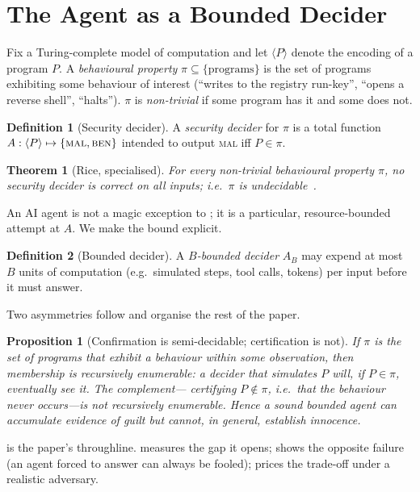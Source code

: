 \documentclass[11pt]{article}
\theoremstyle{plain}
\newtheorem{theorem}{Theorem}
\newtheorem{proposition}{Proposition}
\theoremstyle{definition}
\newtheorem{definition}{Definition}
\begin{document}
\section{The Agent as a Bounded Decider}
\label{sec:framework}
Fix a Turing-complete model of computation and let $\langle P\rangle$ denote
the encoding of a program $P$. A \emph{behavioural property}
$\pi \subseteq \{\text{programs}\}$ is the set of programs exhibiting some
behaviour of interest (``writes to the registry run-key'', ``opens a reverse
shell'', ``halts''). $\pi$ is \emph{non-trivial} if some program has it and
some does not.

\begin{definition}[Security decider]
A \emph{security decider} for $\pi$ is a total function
$A:\langle P\rangle \mapsto \{\textsc{mal},\textsc{ben}\}$ intended to output
\textsc{mal} iff $P\in\pi$.
\end{definition}

\begin{theorem}[Rice, specialised]
\label{thm:rice}
For every non-trivial behavioural property $\pi$, no security decider is
correct on all inputs; i.e.\ $\pi$ is undecidable~\cite{rice1953,sipser2013}.
\end{theorem}

An AI agent is not a magic exception to ; it is a particular,
resource-bounded attempt at $A$. We make the bound explicit.

\begin{definition}[Bounded decider]
A \emph{$B$-bounded decider} $A_B$ may expend at most $B$ units of
computation (e.g.\ simulated steps, tool calls, tokens) per input before it
must answer.
\end{definition}

Two asymmetries follow and organise the rest of the paper.

\begin{proposition}[Confirmation is semi-decidable; certification is not]
\label{prop:semidec}
If $\pi$ is the set of programs that \emph{exhibit} a behaviour within some
observation, then membership is \emph{recursively enumerable}: a decider that
simulates $P$ will, if $P\in\pi$, eventually see it. The complement---%
certifying $P\notin\pi$, i.e.\ that the behaviour \emph{never} occurs---is not
recursively enumerable. Hence a sound bounded agent can accumulate evidence of
guilt but cannot, in general, establish innocence.
\end{proposition}

 is the paper's throughline.  measures the
gap it opens;  shows the opposite failure (an agent forced to
answer can always be fooled);  prices the trade-off under a
realistic adversary.
\end{document}
